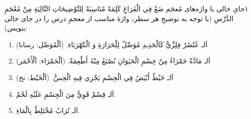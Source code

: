 
\begin{JTamrin}{١}{جایِ خالی با واژه‌های مُعجَم}
ضَعْ فِي الْفَرَاغِ كَلِمَةً مُنَاسِبَةً لِلتَّوْضِيحَاتِ التَّالِيَةِ مِنْ
مُعْجَمِ الدَّرْسِ (با توجه به توضیحِ هر سطر، واژهٔ مناسب از معجمِ درس را
در جای خالی بنویس):

\begin{enumerate}
  \item اَلـ\JdotsW{3cm} عُنْصُرٌ فِلِزِّيٌّ كَالْحَدِيدِ مُوَصِّلٌ
        لِلْحَرَارَةِ وَ الْكَهْرَبَاءِ. (اَلْمُوَصِّل: رسانا)
  \item اَلـ\JdotsW{3cm} مَادَّةٌ حَمْرَاءُ مِنْ جِسْمِ الْحَيَوَانِ تُصْنَعُ
        مِنْهُ أَطْعِمَةٌ. (اَلْحَمْرَاء: اَلْأَحْمَر)
  \item اَلـ\JdotsW{3cm} خَيْطٌ أَبْيَضُ فِي الْجِسْمِ يَجْرِي فِيهِ الْحِسُّ.
        (اَلْخَيْط: نخ)
  \item اَلـ\JdotsW{3cm} قِسْمٌ قَوِيٌّ مِنَ الْجِسْمِ عَلَيْهِ لَحْمٌ.
  \item اَلـ\JdotsW{3cm} تُرَابٌ مُخْتَلِطٌ بِالْمَاءِ.
\end{enumerate}
\end{JTamrin}

